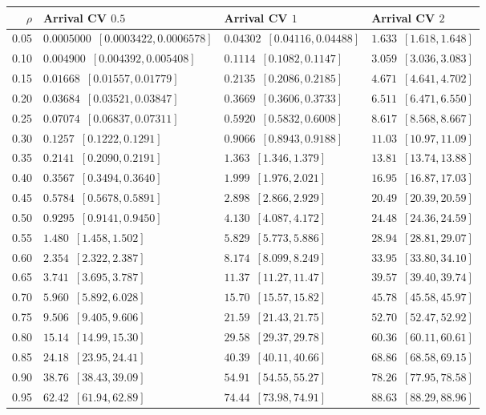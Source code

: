 {\centering\fontsize{8.1}{10.0}\selectfont
\begin{tabular*}{\linewidth}{@{\extracolsep{\fill}}rlll@{}}
\toprule
\(\rho\) & Arrival CV \(0.5\) & Arrival CV \(1\) & Arrival CV \(2\) \\
\midrule
0.05 & \(0.0005000\enspace[0.0003422,0.0006578]\) & \(0.04302\enspace[0.04116,0.04488]\) & \(1.633\enspace[1.618,1.648]\) \\
0.10 & \(0.004900\enspace[0.004392,0.005408]\) & \(0.1114\enspace[0.1082,0.1147]\) & \(3.059\enspace[3.036,3.083]\) \\
0.15 & \(0.01668\enspace[0.01557,0.01779]\) & \(0.2135\enspace[0.2086,0.2185]\) & \(4.671\enspace[4.641,4.702]\) \\
0.20 & \(0.03684\enspace[0.03521,0.03847]\) & \(0.3669\enspace[0.3606,0.3733]\) & \(6.511\enspace[6.471,6.550]\) \\
0.25 & \(0.07074\enspace[0.06837,0.07311]\) & \(0.5920\enspace[0.5832,0.6008]\) & \(8.617\enspace[8.568,8.667]\) \\
0.30 & \(0.1257\enspace[0.1222,0.1291]\) & \(0.9066\enspace[0.8943,0.9188]\) & \(11.03\enspace[10.97,11.09]\) \\
0.35 & \(0.2141\enspace[0.2090,0.2191]\) & \(1.363\enspace[1.346,1.379]\) & \(13.81\enspace[13.74,13.88]\) \\
0.40 & \(0.3567\enspace[0.3494,0.3640]\) & \(1.999\enspace[1.976,2.021]\) & \(16.95\enspace[16.87,17.03]\) \\
0.45 & \(0.5784\enspace[0.5678,0.5891]\) & \(2.898\enspace[2.866,2.929]\) & \(20.49\enspace[20.39,20.59]\) \\
0.50 & \(0.9295\enspace[0.9141,0.9450]\) & \(4.130\enspace[4.087,4.172]\) & \(24.48\enspace[24.36,24.59]\) \\
0.55 & \(1.480\enspace[1.458,1.502]\) & \(5.829\enspace[5.773,5.886]\) & \(28.94\enspace[28.81,29.07]\) \\
0.60 & \(2.354\enspace[2.322,2.387]\) & \(8.174\enspace[8.099,8.249]\) & \(33.95\enspace[33.80,34.10]\) \\
0.65 & \(3.741\enspace[3.695,3.787]\) & \(11.37\enspace[11.27,11.47]\) & \(39.57\enspace[39.40,39.74]\) \\
0.70 & \(5.960\enspace[5.892,6.028]\) & \(15.70\enspace[15.57,15.82]\) & \(45.78\enspace[45.58,45.97]\) \\
0.75 & \(9.506\enspace[9.405,9.606]\) & \(21.59\enspace[21.43,21.75]\) & \(52.70\enspace[52.47,52.92]\) \\
0.80 & \(15.14\enspace[14.99,15.30]\) & \(29.58\enspace[29.37,29.78]\) & \(60.36\enspace[60.11,60.61]\) \\
0.85 & \(24.18\enspace[23.95,24.41]\) & \(40.39\enspace[40.11,40.66]\) & \(68.86\enspace[68.58,69.15]\) \\
0.90 & \(38.76\enspace[38.43,39.09]\) & \(54.91\enspace[54.55,55.27]\) & \(78.26\enspace[77.95,78.58]\) \\
0.95 & \(62.42\enspace[61.94,62.89]\) & \(74.44\enspace[73.98,74.91]\) & \(88.63\enspace[88.29,88.96]\) \\
\bottomrule
\end{tabular*}\par}
